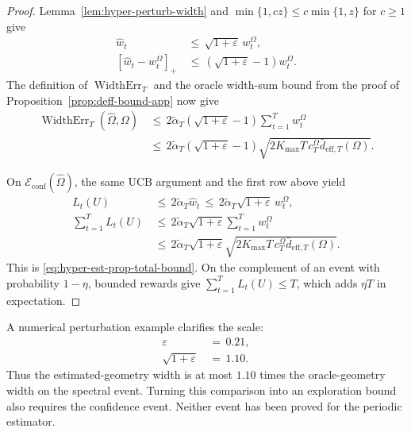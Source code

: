 \documentclass{article} %
\begin{document}
\begin{proof}
Lemma~\ref{lem:hyper-perturb-width} and
\(\min\{1,cz\}\leq c\min\{1,z\}\) for \(c\geq1\) give
\begin{equation}
\label{eq:hyper-est-proof-width}
\begin{aligned}
\widehat w_t
&\,\leq\,
\sqrt{1+\varepsilon}\,w_t^\Omega,
\\
\left[\widehat w_t-w_t^\Omega\right]_+
&\,\leq\,
\left(\sqrt{1+\varepsilon}-1\right)
w_t^\Omega.
\end{aligned}
\end{equation}
The definition of \(\operatorname{WidthErr}_T\) and the oracle width-sum bound
from the proof of Proposition~\ref{prop:deff-bound-app} now give
\begin{equation}
\label{eq:hyper-est-proof-err}
\begin{aligned}
\operatorname{WidthErr}_T(\widehat{\Omega},\Omega)
&\,\leq\,
2\widetilde\alpha_T
\left(\sqrt{1+\varepsilon}-1\right)
\sum_{t=1}^{T}w_t^\Omega
\\
&\,\leq\,
2\widetilde\alpha_T
\left(\sqrt{1+\varepsilon}-1\right)
\sqrt{
2K_{\max}T\,c_T^\Omega
\bar d_{\mathrm{eff},T}(\Omega)
}.
\end{aligned}
\end{equation}

On \(\mathcal E_{\mathrm{conf}}(\widehat\Omega)\), the same UCB argument and
the first row above yield
\begin{equation*}
\begin{aligned}
L_t(U)
&\,\leq\,
2\widetilde\alpha_T
\widehat w_t
\,\leq\,
2\widetilde\alpha_T\sqrt{1+\varepsilon}\,w_t^\Omega,
\\
\sum_{t=1}^{T}L_t(U)
&\,\leq\,
2\widetilde\alpha_T\sqrt{1+\varepsilon}
\sum_{t=1}^{T}w_t^\Omega
\\
&\,\leq\,
2\widetilde\alpha_T\sqrt{1+\varepsilon}
\sqrt{
2K_{\max}T\,c_T^\Omega
\bar d_{\mathrm{eff},T}(\Omega)
}.
\end{aligned}
\end{equation*}
This is \eqref{eq:hyper-est-prop-total-bound}. On the complement of an event
with probability \(1-\eta\), bounded rewards give
\(\sum_{t=1}^T L_t(U)\leq T\), which adds \(\eta T\) in expectation.
\end{proof}

A numerical perturbation example clarifies the scale:
\begin{align}
\varepsilon
&\,=\,
0.21,
\label{eq:hyper-est-example-eps}
\\
\sqrt{1+\varepsilon}
&\,=\,
1.10.
\label{eq:hyper-est-example-sqrt}
\end{align}
Thus the estimated-geometry width is at most \(1.10\) times the
oracle-geometry width on the spectral event. Turning this comparison into an
exploration bound also requires the confidence event. Neither event has been
proved for the periodic estimator.
\end{document}
